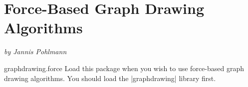 %
%
%

\section{Force-Based Graph Drawing Algorithms}
\label{section-library-graphdrawing-force-based}

{\emph{by Jannis Pohlmann}}


\begin{tikzlibrary}{graphdrawing.force}
  Load this package when you wish to use force-based graph drawing
  algorithms. You should load the |graphdrawing| library first.
\end{tikzlibrary}

\ifluatex\relax{}\expandafter\endinput\fi


\subsection{Overview}


...

\subsubsection{Spring and Spring-Electrical Layouts}



